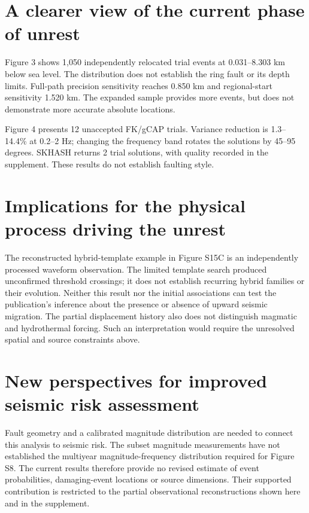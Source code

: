

\section*{A clearer view of the current phase of unrest}
Figure 3 shows 1,050 independently relocated trial events at 0.031--8.303 km below sea level. The distribution does not establish the ring fault or its depth limits. Full-path precision sensitivity reaches 0.850 km and regional-start sensitivity 1.520 km. The expanded sample provides more events, but does not demonstrate more accurate absolute locations.

Figure 4 presents 12 unaccepted FK/gCAP trials. Variance reduction is 1.3--14.4\% at 0.2--2 Hz; changing the frequency band rotates the solutions by 45--95 degrees. SKHASH returns 2 trial solutions, with quality recorded in the supplement. These results do not establish faulting style.




\section*{Implications for the physical process driving the unrest}
The reconstructed hybrid-template example in Figure S15C is an independently processed waveform observation. The limited template search produced \CurrentHybridCandidates{} unconfirmed threshold crossings; it does not establish recurring hybrid families or their evolution. Neither this result nor the initial associations can test the publication's inference about the presence or absence of upward seismic migration. The partial displacement history also does not distinguish magmatic and hydrothermal forcing. Such an interpretation would require the unresolved spatial and source constraints above.

\section*{New perspectives for improved seismic risk assessment}
Fault geometry and a calibrated magnitude distribution are needed to connect this analysis to seismic risk. The subset magnitude measurements have not established the multiyear magnitude-frequency distribution required for Figure S8. The current results therefore provide no revised estimate of event probabilities, damaging-event locations or source dimensions. Their supported contribution is restricted to the partial observational reconstructions shown here and in the supplement.
